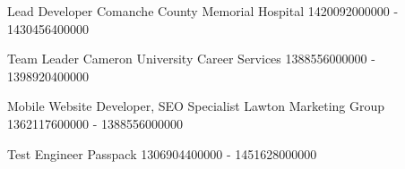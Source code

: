 
\begin{cventries}

  \cventry
    {Lead Developer}
    {Comanche County Memorial Hospital}
    {}
    {1420092000000 - 1430456400000}
    

  \cventry
    {Team Leader}
    {Cameron University Career Services}
    {}
    {1388556000000 - 1398920400000}
    

  \cventry
    {Mobile Website Developer, SEO Specialist}
    {Lawton Marketing Group}
    {}
    {1362117600000 - 1388556000000}
    

  \cventry
    {Test Engineer}
    {Passpack}
    {}
    {1306904400000 - 1451628000000}
    

\end{cventries}

